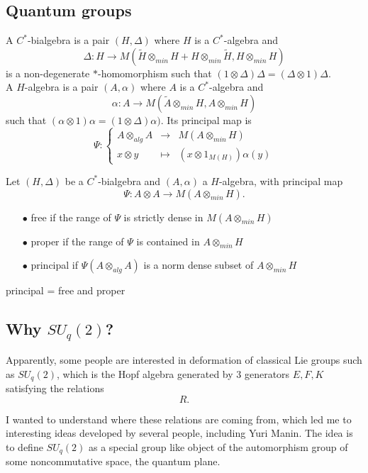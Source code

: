 \subsection{Quantum groups}
 
A $C^*$-bialgebra is a pair $(H,\Delta)$ where $H$ is a $C^*$-algebra and 
\[\Delta: H \rightarrow M(\tilde H \otimes_{min} H + H\otimes_{min} \tilde H, H\otimes_{min} H)\]
is a non-degenerate $*$-homomorphism such that $(1\otimes \Delta) \Delta = (\Delta\otimes 1 ) \Delta$.\\

A $H$-algebra is a pair $(A,\alpha)$ where $A$ is a $C^*$-algebra and 
\[\alpha : A\rightarrow M(\tilde A \otimes_{min} H , A\otimes_{min} H)\]
such that $(\alpha\otimes 1) \alpha = (1 \otimes \Delta )\alpha)$. Its principal map is 
\[\Psi : \left\{ \begin{array}{rcl}
A\otimes_{alg} A & \rightarrow & M(A\otimes_{min} H) \\
x\otimes y & \mapsto & (x \otimes 1_{M(H)})\alpha (y)
\end{array}\right.\]

Let $(H,\Delta)$ be a $C^*$-bialgebra and $(A,\alpha)$ a $H$-algebra, with principal map
\[\Psi: A\otimes A\rightarrow M(A\otimes_{min} H).\]
\begin{itemize}
\item[$\bullet$] free if the range of $\Psi$ is strictly dense in $M(A\otimes_{min} H)$
\item[$\bullet$] proper if the range of $\Psi$ is contained in $A\otimes_{min} H$
\item[$\bullet$] principal if $\Psi(A\otimes_{alg}A )$ is a norm dense subset of $A\otimes_{min} H$
\end{itemize}
principal = free and proper

\subsection{Why $SU_q(2)$?}

Apparently, some people are interested in deformation of classical Lie groups such as $SU_q(2)$, which is the Hopf algebra generated by $3$ generators $E,F,K$ satisfying the relations 
\[R.\]

I wanted to understand where these relations are coming from, which led me to interesting ideas developed by several people, including Yuri Manin. The idea is to define $SU_q(2)$ as a special group like object of the automorphism group of some noncommutative space, the quantum plane.\\

